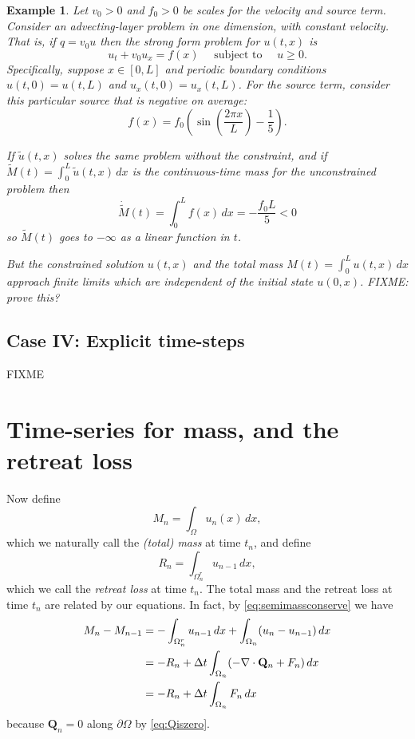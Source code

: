 \documentclass[final,leqno,onefignum,onetabnum]{siamltex1213bueler}
\newtheorem{example}{Example}
\newcommand\bQ{\mathbf{Q}}
\newcommand{\Div}{\nabla\cdot}
\begin{document}
\begin{example}  Let $v_0>0$ and $f_0>0$ be scales for the velocity and source term.  Consider an advecting-layer problem in one dimension, with constant velocity.  That is, if $q = v_0 u$ then the strong form problem for $u(t,x)$ is
\begin{equation}
u_t + v_0 u_x = f(x) \quad \text{ subject to } \quad u\ge 0.  \label{eq:ex:advectlayer}
\end{equation}
Specifically, suppose $x\in[0,L]$ and periodic boundary conditions $u(t,0)=u(t,L)$ and $u_x(t,0)=u_x(t,L)$.  For the source term, consider this particular source that is negative on average:
    $$f(x) = f_0 \left(\sin\left(\frac{2\pi x}{L}\right) - \frac{1}{5}\right).$$

If $\tilde u(t,x)$ solves the same problem without the constraint, and if $\tilde M(t) = \int_0^L \tilde u(t,x)\,dx$ is the continuous-time mass for the unconstrained problem then
    $$\dot{\tilde M}(t) = \int_0^L f(x)\,dx = -\frac{f_0 L}{5} < 0$$
so $\tilde M(t)$ goes to $-\infty$ as a linear function in $t$.

But the constrained solution $u(t,x)$ and the total mass $M(t) = \int_0^L u(t,x)\,dx$ approach finite limits which are independent of the initial state $u(0,x)$.  FIXME: prove this?
\end{example}

\subsection{Case IV: Explicit time-steps} \label{subsec:explicit}  FIXME


\section{Time-series for mass, and the retreat loss}  \label{sec:timeseries}

Now define
\begin{equation}
M_n = \int_\Omega u_n(x)\,dx, \label{eq:totalmassdefn}
\end{equation}
which we naturally call the \emph{(total) mass} at time $t_n$, and define
\begin{equation}
R_n = \int_{\Omega_n^r} u_{n-1}\,dx, \label{eq:retreatlossdefn}
\end{equation}
which we call the \emph{retreat loss} at time $t_n$.  The total mass and the retreat loss at time $t_n$ are related by our equations.  In fact, by \eqref{eq:semimassconserve} we have
\begin{align}
M_n - M_{n-1} &=  - \int_{\Omega_n^r} u_{n-1}\,dx + \int_{\Omega_n} (u_n - u_{n-1})\,dx \label{eq:massstep} \\
   &= - R_n + \Delta t \int_{\Omega_n} (- \Div \bQ_n + F_n) \,dx \notag \\
   &= - R_n + \Delta t \int_{\Omega_n} F_n\,dx \notag
\end{align}
because $\bQ_n=0$ along $\partial \Omega$ by \eqref{eq:Qiszero}.
\end{document}
